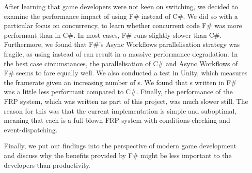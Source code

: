 After learning that game developers were not keen on switching, we decided to examine the performance impact of using F\# instead of C\#. We did so with a particular focus on concurrency, to learn whether concurrent code F\# was more performant than in C\#. In most cases, F\# runs slightly slower than C\#. Furthermore, we found that F\#'s Async Workflows parallelisation strategy was fragile, as using  instead of  can result in a massive performance degradation. In the best case circumstances, the  parallelisation of C\# and Async Workflows of F\# seems to fare equally well. We also conducted a test in Unity, which measures the framerate given an increasing number of s. We found that s written in F\# was a little less performant compared to C\#. Finally, the performance of the \gls{FRP} system, which was written as part of this project, was much slower still. The reason for this was that the current implementation is simple and suboptimal, meaning that each  is a full-blown \gls{FRP} system with conditions-checking and event-dispatching.

Finally, we put out findings into the perspective of modern game development and discuss why the benefits provided by F\# might be less important to the developers than productivity.

